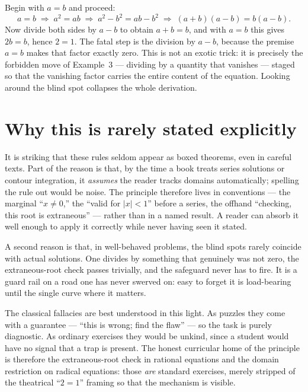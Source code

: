 \documentclass{essay}
\begin{document}
\begin{example}[The ``\(2 = 1\)'' fallacy]
  Begin with \(a = b\) and proceed:
  \[ a = b \;\Rightarrow\; a^{2} = ab \;\Rightarrow\; a^{2} - b^{2} = ab - b^{2} \;\Rightarrow\; (a+b)(a-b) = b(a-b). \]
  Now divide both sides by \(a - b\) to obtain \(a + b = b\), and with \(a = b\) this gives
  \(2b = b\), hence \(2 = 1\). The fatal step is the division by \(a - b\), because the premise
  \(a = b\) makes that factor exactly zero. This is not an exotic trick: it is precisely the
  forbidden move of Example~3 --- dividing by a quantity that vanishes --- staged so that the
  vanishing factor carries the entire content of the equation. Looking around the blind spot
  collapses the whole derivation.
\end{example}

\section{Why this is rarely stated explicitly}

It is striking that these rules seldom appear as boxed theorems, even in careful texts. Part
of the reason is that, by the time a book treats series solutions or contour integration, it
\emph{assumes} the reader tracks domains automatically; spelling the rule out would be noise.
The principle therefore lives in conventions --- the marginal ``\(x \neq 0\),'' the ``valid for
\(|x| < 1\)'' before a series, the offhand ``checking, this root is extraneous'' --- rather
than in a named result. A reader can absorb it well enough to apply it correctly while never
having seen it stated.

A second reason is that, in well-behaved problems, the blind spots rarely coincide with
actual solutions. One divides by something that genuinely was not zero, the
extraneous-root check passes trivially, and the safeguard never has to fire. It is a guard
rail on a road one has never swerved on: easy to forget it is load-bearing until the single
curve where it matters.

The classical fallacies are best understood in this light. As puzzles they come with a
guarantee --- ``this is wrong; find the flaw'' --- so the task is purely diagnostic. As
ordinary exercises they would be unkind, since a student would have no signal that a trap is
present. The honest curricular home of the principle is therefore the extraneous-root check
in rational equations and the domain restriction on radical equations: those \emph{are}
standard exercises, merely stripped of the theatrical ``\(2 = 1\)'' framing so that the
mechanism is visible.
\end{document}

